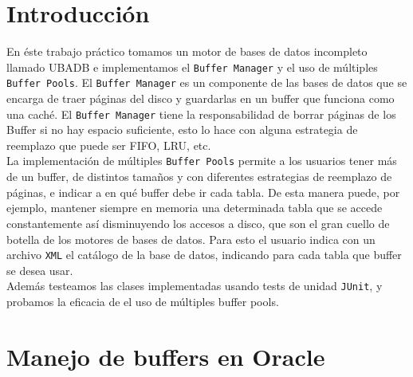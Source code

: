 \documentclass[a4paper,10pt]{article}
\begin{document}
		\maketitle

\newpage
\thispagestyle{empty}
\mbox{}

	
\newpage

\section{Introducci\'on}
En éste trabajo práctico tomamos un motor de bases de datos incompleto llamado UBADB e implementamos el \texttt{Buffer Manager} y el uso de múltiples \texttt{Buffer Pools}. El \texttt{Buffer Manager} es un componente de las bases de datos que se encarga de traer páginas del disco y guardarlas en un buffer que funciona como una caché. El \texttt{Buffer Manager} tiene la responsabilidad de borrar páginas de los Buffer si no hay espacio suficiente, esto lo hace con alguna estrategia de reemplazo que puede ser FIFO, LRU, etc.\\

La implementación de múltiples \texttt{Buffer Pools} permite a los usuarios tener más de un buffer, de distintos tamaños y con diferentes estrategias de reemplazo de páginas, e indicar a en qué buffer debe ir cada tabla. De esta manera puede, por ejemplo, mantener siempre en memoria una determinada tabla que se accede constantemente así disminuyendo los accesos a disco, que son el gran cuello de botella de los motores de bases de datos. Para esto el usuario indica con un archivo \texttt{XML} el catálogo de la base de datos, indicando para cada tabla que buffer se desea usar.\\

Además testeamos las clases implementadas usando tests de unidad \texttt{JUnit}, y probamos la eficacia de el uso de múltiples buffer pools.



 \newpage

\section{Manejo de buffers en Oracle}
\end{document}
